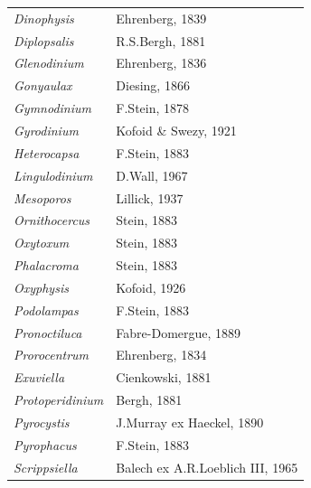 \documentclass[draft]{agujournal2019}
\begin{document}
\begin{table}
{\begin{tabular}{@{}ll@{}}
\textit{Dinophysis}        & Ehrenberg, 1839                                            \\
\textit{Diplopsalis}       & R.S.Bergh, 1881                                            \\
\textit{Glenodinium}       & Ehrenberg, 1836     
\\
\textit{Gonyaulax}         & Diesing, 1866                                              \\
\textit{Gymnodinium}       & F.Stein, 1878                                              \\
\textit{Gyrodinium}        & Kofoid \& Swezy, 1921                                      \\
\textit{Heterocapsa}       & F.Stein, 1883                                              \\
\textit{Lingulodinium}     & D.Wall, 1967                                               \\
\textit{Mesoporos}         & Lillick, 1937                                              \\
\textit{Ornithocercus}     & Stein, 1883                                                \\
\textit{Oxytoxum}          & Stein, 1883                                                \\
\textit{Phalacroma}        & Stein, 1883                                                \\
\textit{Oxyphysis}         & Kofoid, 1926                                               \\
\textit{Podolampas}        & F.Stein, 1883                                              \\
\textit{Pronoctiluca}      & Fabre-Domergue, 1889                                       \\
\textit{Prorocentrum}      & Ehrenberg, 1834                                            \\
\textit{Exuviella}         & Cienkowski, 1881                                           \\
\textit{Protoperidinium}   & Bergh, 1881                                                \\
\textit{Pyrocystis}        & J.Murray ex Haeckel, 1890                                  \\
\textit{Pyrophacus}        & F.Stein, 1883                                              \\
\textit{Scrippsiella}      & Balech ex A.R.Loeblich III, 1965                           \\

\end{tabular}}
\end{table}
\end{document}
